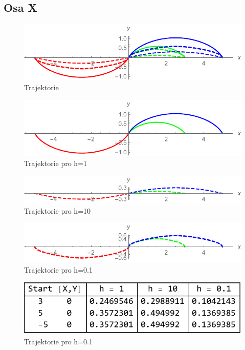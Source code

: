 \documentclass[reqno, a4paper]{amsart}
\numberwithin{equation}{section}
\begin{document}
\subsection{Osa X}
\label{sec: OsaX}
\begin{figure}
\includegraphics[scale=0.7]{figures/OsaX1.pdf}
\caption{Trajektorie}
\label{Xtraj}
\end{figure}
\begin{figure}
\includegraphics[scale=0.7]{figures/OsaX2.pdf}
\caption{Trajektorie pro h=1}
\label{Xtraj1}
\end{figure}
\begin{figure}
\includegraphics[scale=0.7]{figures/OsaX3.pdf}
\caption{Trajektorie pro h=10}
\label{Xtraj10}
\end{figure}
\begin{figure}
\includegraphics[scale=0.7]{figures/OsaX4.pdf}
\caption{Trajektorie pro h=0.1}
\label{Xtraj0.1}
\end{figure}
\begin{figure}
\includegraphics[scale=0.7]{figures/OsaX - tab. čas.pdf}
\caption{Trajektorie pro h=0.1}
\label{TabX1}
\end{figure}
\end{document}
